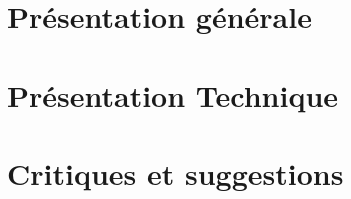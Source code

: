 \documentclass[12pt, a4paper]{article}%
\begin{document}
\section{Présentation générale}

\section{Présentation Technique}
\section{Critiques et suggestions}
\end{document}
